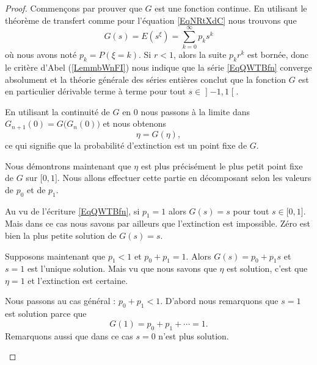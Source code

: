 \begin{proof}
	Commençons par prouver que \( G\) est une fonction continue. En utilisant le théorème de transfert comme pour l'équation \eqref{EqNRtXdC} nous trouvons que
	\begin{equation}    \label{EqQWTBfn}
		G(s)=E(s^{\xi})=\sum_{k=0}^{\infty}p_ks^k
	\end{equation}
	où nous avons noté \( p_k=P(\xi=k)\). Si \( r<1\), alors la suite \( p_kr^k\) est bornée, donc le critère d'Abel (\ref{LemmbWnFI}) nous indique que la série \eqref{EqQWTBfn} converge absolument et la théorie générale des séries entières conclut que la fonction \( G\) est en particulier dérivable terme à terme pour tout \( s\in\mathopen] -1 , 1 \mathclose[\).

	\begin{subproof}


		En utilisant la continuité de \( G\) en \( 0\) nous passons à la limite dans \( G_{n+1}(0)=G\big( G_n(0) \big)\) et nous obtenons
		\begin{equation}
			\eta=G(\eta),
		\end{equation}
		ce qui signifie que la probabilité d'extinction est un point fixe de \( G\).


		Nous démontrons maintenant que \( \eta\) est plus précisément le plus petit point fixe de \( G\) sur \( \mathopen[ 0 , 1 \mathclose]\). Nous allons effectuer cette partie en décomposant selon les valeurs de \( p_0\) et de \( p_1\).

		Au vu de l'écriture \eqref{EqQWTBfn}, si \( p_1=1\) alors \( G(s)=s\) pour tout \( s\in\mathopen[ 0 , 1 \mathclose]\). Mais dans ce cas nous savons par ailleurs que l'extinction est impossible.  Zéro est bien la plus petite solution de \( G(s)=s\).

		Supposons maintenant que \( p_1<1\) et \( p_0+p_1=1\). Alors \( G(s)=p_0+p_1s\) et \( s=1\) est l'unique solution. Mais vu que nous savons que \( \eta\) est solution, c'est que \( \eta=1\) et l'extinction est certaine.

		Nous passons au cas général : \( p_0+p_1<1\). D'abord nous remarquons que \( s=1\) est solution parce que
		\begin{equation}
			G(1)=p_0+p_1+\cdots=1.
		\end{equation}
		Remarquons aussi que dans ce cas \( s=0\) n'est plus solution.


\end{subproof}
\end{proof}
